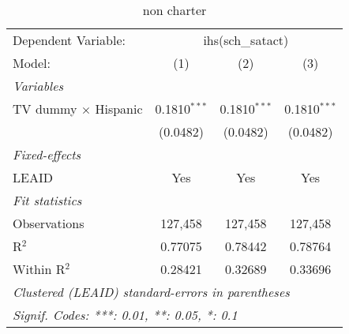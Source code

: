 \begin{table}[htbp]
\centering
\caption{non charter}
\begin{tabular}{lccc}
\tabularnewline\midrule\midrule
Dependent Variable:&\multicolumn{3}{c}{ihs(sch\_satact)}\\
Model:&(1) & (2) & (3)\\
\midrule \emph{Variables}&   &   &  \\
TV dummy $\times$ Hispanic & 0.1810$^{***}$ & 0.1810$^{***}$ & 0.1810$^{***}$\\
  &(0.0482) & (0.0482) & (0.0482)\\
\midrule \emph{Fixed-effects}&   &   &  \\
LEAID & Yes & Yes & Yes\\
\midrule \emph{Fit statistics}&  & & \\
Observations & 127,458&127,458&127,458\\
R$^2$ & 0.77075&0.78442&0.78764\\
Within R$^2$ & 0.28421&0.32689&0.33696\\
\midrule\midrule\multicolumn{4}{l}{\emph{Clustered (LEAID) standard-errors in parentheses}}\\
\multicolumn{4}{l}{\emph{Signif. Codes: ***: 0.01, **: 0.05, *: 0.1}}\\
\end{tabular}
\end{table}

